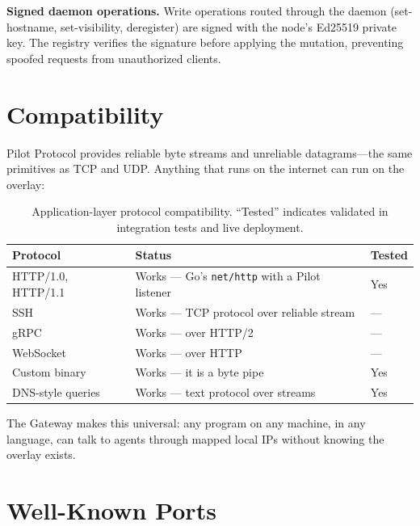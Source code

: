 \documentclass[11pt,a4paper]{article}
\begin{document}
\textbf{Signed daemon operations.} Write operations routed through the daemon (set-hostname, set-visibility, deregister) are signed with the node's Ed25519 private key. The registry verifies the signature before applying the mutation, preventing spoofed requests from unauthorized clients.

\section{Compatibility}

Pilot Protocol provides reliable byte streams and unreliable datagrams---the same primitives as TCP and UDP. Anything that runs on the internet can run on the overlay:

\begin{table}[h]
\centering
\begin{tabular}{@{}lll@{}}
\toprule
\textbf{Protocol} & \textbf{Status} & \textbf{Tested} \\
\midrule
HTTP/1.0, HTTP/1.1 & Works --- Go's \texttt{net/http} with a Pilot listener & Yes \\
SSH                 & Works --- TCP protocol over reliable stream             & --- \\
gRPC                & Works --- over HTTP/2                                   & --- \\
WebSocket           & Works --- over HTTP                                     & --- \\
Custom binary       & Works --- it is a byte pipe                             & Yes \\
DNS-style queries   & Works --- text protocol over streams                    & Yes \\
\bottomrule
\end{tabular}
\caption{Application-layer protocol compatibility. ``Tested'' indicates validated in integration tests and live deployment.}
\label{tab:compat}
\end{table}

The Gateway makes this universal: any program on any machine, in any language, can talk to agents through mapped local IPs without knowing the overlay exists.

\section{Well-Known Ports}
\end{document}
